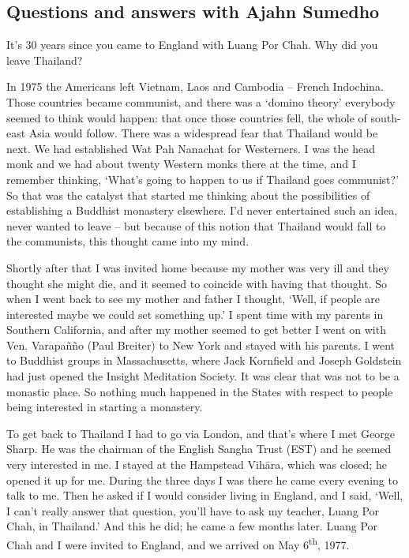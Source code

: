 
\subsection{Questions and answers with Ajahn Sumedho}

\question{}
It's 30 years since you came to England with Luang Por Chah. Why did
you leave Thailand?

\answer{}
In 1975 the Americans left Vietnam, Laos and Cambodia --
French Indochina. Those countries became communist, and there was a
`domino theory' everybody seemed to think would happen: that once those
countries fell, the whole of south-east Asia would follow. There was a
widespread fear that Thailand would be next. We had established Wat Pah
Nanachat for Westerners. I was the head monk and we had about twenty
Western monks there at the time, and I remember thinking, `What's going
to happen to us if Thailand goes communist?' So that was the catalyst
that started me thinking about the possibilities of establishing a
Buddhist monastery elsewhere. I'd never entertained such an idea, never
wanted to leave -- but because of this notion that Thailand would fall
to the communists, this thought came into my mind. 

Shortly after that I was invited home because my mother was very ill and
they thought she might die, and it seemed to coincide with having that
thought. So when I went back to see my mother and father I thought, 
`Well, if people are interested maybe we could set something up.' I
spent time with my parents in Southern California, and after my mother
seemed to get better I went on with Ven. Varapañño (Paul Breiter) to New
York and stayed with his parents. I went to Buddhist groups in
Massachusetts, where Jack Kornfield and Joseph Goldstein had just opened
the Insight Meditation Society. It was clear that was not to be a
monastic place. So nothing much happened in the States with respect to
people being interested in starting a monastery. 

To get back to Thailand I had to go via London, and that's where I met
George Sharp. He was the chairman of the English Sangha Trust (EST) and
he seemed very interested in me. I stayed at the Hampstead Vihāra, which
was closed; he opened it up for me. During the three days I was there he
came every evening to talk to me. Then he asked if I would consider
living in England, and I said, `Well, I can't really answer that
question, you'll have to ask my teacher, Luang Por Chah, in Thailand.'
And this he did; he came a few months later. Luang Por Chah and I were
invited to England, and we arrived on May 6\textsuperscript{th}, 1977. 

